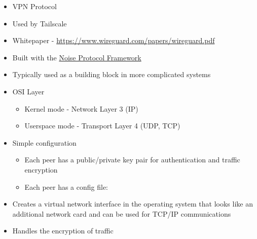 \begin{itemize}
\tightlist
\item
  VPN Protocol
\item
  Used by Tailscale
\item
  Whitepaper - \url{https://www.wireguard.com/papers/wireguard.pdf}
\item
  Built with the \href{notes/0204-noise}{Noise Protocol Framework}
\item
  Typically used as a building block in more complicated systems
\item
  OSI Layer

  \begin{itemize}
  \tightlist
  \item
    Kernel mode - Network Layer 3 (IP)
  \item
    Userspace mode - Transport Layer 4 (UDP, TCP)
  \end{itemize}
\item
  Simple configuration

  \begin{itemize}
  \item
    Each peer has a public/private key pair for authentication and
    traffic encryption
  \item
    Each peer has a config file:

\begin{Shaded}
\begin{Highlighting}[]
\KeywordTok{[}\KeywordTok{]}
 \OperatorTok{=} \ErrorTok{/}
 \OperatorTok{=} 
 \OperatorTok{=} \OperatorTok{=}

\KeywordTok{[}\KeywordTok{]}
 \OperatorTok{=} \ErrorTok{+}\ErrorTok{+}\ErrorTok{/}\ErrorTok{+}\OperatorTok{=}
 \OperatorTok{=} \ErrorTok{/}
 \OperatorTok{=} \ErrorTok{:}
 \OperatorTok{=} 
\end{Highlighting}
\end{Shaded}
  \end{itemize}
\item
  Creates a virtual network interface in the operating system that looks
  like an additional network card and can be used for TCP/IP
  communications
\item
  Handles the encryption of traffic


\end{itemize}
